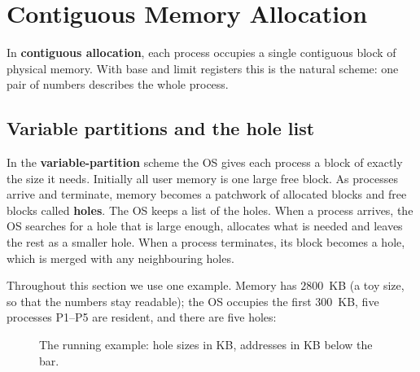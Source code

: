 \documentclass[11pt,a4paper]{article}
\newcommand{\term}[1]{\textbf{\color{mintdeep}#1}}
\begin{document}
\section{Contiguous Memory Allocation}
\label{sec:contig}

In \term{contiguous allocation}, each process occupies a single contiguous block of physical memory. With base and limit registers this is the natural scheme: one pair of numbers describes the whole process.

\subsection{Variable partitions and the hole list}

In the \term{variable-partition} scheme the OS gives each process a block of exactly the size it needs. Initially all user memory is one large free block. As processes arrive and terminate, memory becomes a patchwork of allocated blocks and free blocks called \term{holes}. The OS keeps a list of the holes. When a process arrives, the OS searches for a hole that is large enough, allocates what is needed and leaves the rest as a smaller hole. When a process terminates, its block becomes a hole, which is merged with any neighbouring holes.

Throughout this section we use one example. Memory has $2800$~KB (a toy size, so that the numbers stay readable); the OS occupies the first $300$~KB, five processes P1--P5 are resident, and there are five holes:

\begin{figure}[H]
\centering
{}
\caption{The running example: hole sizes in KB, addresses in KB below the bar.}
\end{figure}
\end{document}
